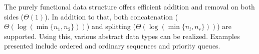 The purely functional data structure offers efficient addition and removal on both sides (\(\Theta(1)\)). In addition to that, both concatenation (\(\Theta(\log(\min\{n_1,n_2\}))\)) and splitting (\(\Theta(\log(\min\{n_l,n_r\}))\)) are supported. Using this, various abstract data types can be realized. Examples presented include ordered and ordinary sequences and priority queues.